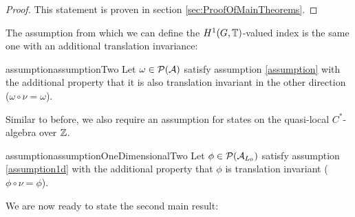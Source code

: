 \documentclass[11pt,a4paper,twoside]{article}
\numberwithin{equation}{section}
\begin{document}
	\begin{proof}
		This statement is proven in section \ref{sec:ProofOfMainTheorems}.
	\end{proof}
	The assumption from which we can define the $H^1(G,\mathbb T)$-valued index is the same one with an additional translation invariance:
	\begin{restatable}{assumption}{assumptionTwo}\label{assumption:2Translations}
		Let $\omega\in\mathcal P(\mathcal A)$ satisfy assumption \ref{assumption} with the additional property that it is also translation invariant in the other direction ($\omega\circ\nu=\omega$).
	\end{restatable}
	Similar to before, we also require an assumption for states on the quasi-local $C^*$-algebra over $\mathbb Z$.
	\begin{restatable}{assumption}{assumptionOneDimensionalTwo}\label{assumption1dWithTranslation}
		Let $\phi\in\mathcal P(\mathcal A_{L_0})$ satisfy assumption \ref{assumption1d} with the additional property that $\phi$ is translation invariant ($\phi\circ\nu=\phi$).
	\end{restatable}
	We are now ready to state the second main result:
\end{document}
